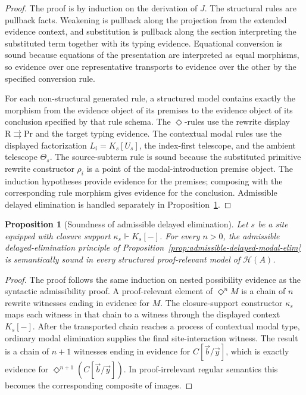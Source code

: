 \documentclass[11pt]{article}
\newcommand{\Proc}{\mathrm{Pr}}
\newcommand{\Rew}{\mathrm{R}}
\newcommand{\Dia}{\Diamond}
\newtheorem{proposition}[definition]{Proposition}
\begin{document}
\begin{proof}
The proof is by induction on the derivation of \(J\).  The structural rules are
pullback facts.  Weakening is pullback along the projection from the extended
evidence context, and substitution is pullback along the section interpreting
the substituted term together with its typing evidence.  Equational conversion
is sound because equations of the presentation are interpreted as equal
morphisms, so evidence over one representative transports to evidence over the
other by the specified conversion rule.

For each non-structural generated rule, a structured model contains exactly the
morphism from the evidence object of its premises to the evidence object of its
conclusion specified by that rule schema.  The \(\Dia\)-rules use the rewrite
display \(\Rew\rightrightarrows\Proc\) and the target typing evidence.  The
contextual modal rules use the displayed factorization \(L_i=K_s[U_s]\), the
index-first telescope, and the ambient telescope \(\Theta_s\).  The
source-subterm rule is sound because the substituted primitive rewrite
constructor \(\rho_i\) is a point of the modal-introduction premise object.  The
induction hypotheses provide evidence for the premises; composing with the
corresponding rule morphism gives evidence for the conclusion.  Admissible
delayed elimination is handled separately in
Proposition~\ref{prop:soundness-admissible-delayed}.
\end{proof}

\begin{proposition}[Soundness of admissible delayed elimination]
\label{prop:soundness-admissible-delayed}
Let \(s\) be a site equipped with closure support \(\kappa_s\Vdash K_s[-]\).
For every \(n>0\), the admissible delayed-elimination principle of
Proposition~\ref{prop:admissible-delayed-modal-elim} is semantically sound in
every structured proof-relevant model of \(\mathcal H(A)\).
\end{proposition}

\begin{proof}
The proof follows the same induction on nested possibility evidence as the
syntactic admissibility proof.  A proof-relevant element of \(\Dia^n M\) is a
chain of \(n\) rewrite witnesses ending in evidence for \(M\).  The
closure-support constructor \(\kappa_s\) maps each witness in that chain to a
witness through the displayed context \(K_s[-]\).  After the transported chain
reaches a process of contextual modal type, ordinary modal elimination supplies
the final site-interaction witness.  The result is a chain of \(n+1\) witnesses
ending in evidence for \(C[\vec b/\vec y]\), which is exactly evidence for
\(\Dia^{n+1}(C[\vec b/\vec y])\).  In proof-irrelevant regular semantics this
becomes the corresponding composite of images.
\end{proof}
\end{document}
